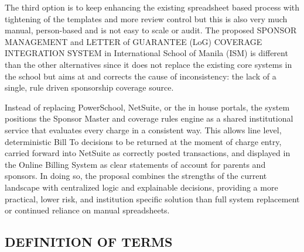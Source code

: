     The third option is to keep enhancing the existing spreadsheet based process with tightening of the templates and more review control but this is also very much manual, person-based and is not easy to scale or audit. The proposed SPONSOR MANAGEMENT and LETTER of GUARANTEE (LoG) COVERAGE INTEGRATION SYSTEM in International School of Manila (ISM) is different than the other alternatives since it does not replace the existing core systems in the school but aims at and corrects the cause of inconsistency: the lack of a single, rule driven sponsorship coverage source.
    
    Instead of replacing PowerSchool, NetSuite, or the in house portals, the system positions the Sponsor Master and coverage rules engine as a shared institutional service that evaluates every charge in a consistent way. This allows line level, deterministic Bill To decisions to be returned at the moment of charge entry, carried forward into NetSuite as correctly posted transactions, and displayed in the Online Billing System as clear statements of account for parents and sponsors. In doing so, the proposal combines the strengths of the current landscape with centralized logic and explainable decisions, providing a more practical, lower risk, and institution specific solution than full system replacement or continued reliance on manual spreadsheets.

\subsection{DEFINITION OF TERMS}

